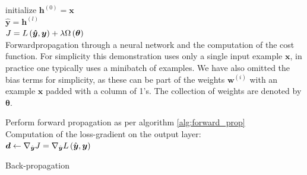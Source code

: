 \begin{algorithm}\label{alg:forward_prop}
\SetAlgoLined
{}
 initialize $\boldsymbol{h}^{(0)} = \boldsymbol{x}$ \\
$\hat{\boldsymbol{y}} = \boldsymbol{h}^{(l)}$ \\
$J = L\left (\boldsymbol{\hat{y}}, \boldsymbol{y}\right) + \lambda \Omega \left (\boldsymbol{\theta}\right)$ \\
 \caption{Forwardpropagation through a neural network and the computation of the cost function. For simplicity this demonstration uses only a single input example $\boldsymbol{x}$, in practice one typically uses a minibatch of examples. We have also omitted the bias terms for simplicity, as these can be part of the weights $\boldsymbol{w}^{(i)}$ with an example $\boldsymbol{x}$ padded with a column of 1's. The collection of weights are denoted by $\boldsymbol{\theta}$.}
\end{algorithm}

\begin{algorithm}\label{alg:back_prop}
\SetAlgoLined
{}
Perform forward propagation as per algorithm \ref{alg:forward_prop}\\
Computation of the loss-gradient on the output layer:\\
$\boldsymbol{d} \leftarrow \nabla_{\hat{\boldsymbol{y}}} J =  \nabla_{\hat{\boldsymbol{y}}} L\left (\hat{\boldsymbol{y}}, \boldsymbol{y}\right)$ \\
\caption{Back-propagation}
\end{algorithm}

